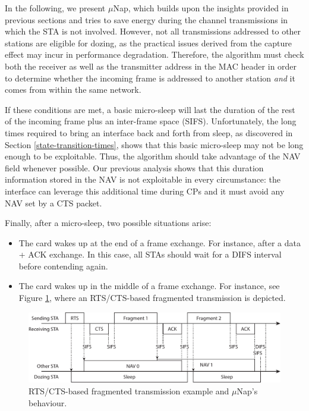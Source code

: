 \documentclass[twoside,nohyper]{tufte-book}
\providecommand{\tightlist}{%
  \setlength{\itemsep}{0pt}\setlength{\parskip}{0pt}}
\theoremstyle{definition}
\theoremstyle{definition}
\theoremstyle{definition}
\theoremstyle{remark}
\begin{document}
In the following, we present \(\mu\)Nap, which builds upon the insights
provided in previous sections and tries to save energy during the
channel transmissions in which the STA is not involved. However, not all
transmissions addressed to other stations are eligible for dozing, as
the practical issues derived from the capture effect may incur in
performance degradation. Therefore, the algorithm must check both the
receiver as well as the transmitter address in the MAC header in order
to determine whether the incoming frame is addressed to another station
\emph{and} it comes from within the same network.

If these conditions are met, a basic micro-sleep will last the duration
of the rest of the incoming frame plus an inter-frame space (SIFS).
Unfortunately, the long times required to bring an interface back and
forth from sleep, as discovered in Section \ref{state-transition-times},
shows that this basic micro-sleep may not be long enough to be
exploitable. Thus, the algorithm should take advantage of the NAV field
whenever possible. Our previous analysis shows that this duration
information stored in the NAV is not exploitable in every circumstance:
the interface can leverage this additional time during CPs and it must
avoid any NAV set by a CTS packet.

Finally, after a micro-sleep, two possible situations arise:

\begin{itemize}
\tightlist
\item
  The card wakes up at the end of a frame exchange. For instance, after
  a data + ACK exchange. In this case, all STAs should wait for a DIFS
  interval before contending again.
\item
  The card wakes up in the middle of a frame exchange. For instance, see
  Figure \ref{fig:fragments}, where an RTS/CTS-based fragmented
  transmission is depicted.
\end{itemize}




\begin{figure}

{\centering \includegraphics{img/05/fragments} 

}

\caption[RTS/CTS-based fragmented transmission example and
\(\mu\)Nap's behaviour.]{RTS/CTS-based fragmented transmission example and
\(\mu\)Nap's behaviour.}\label{fig:fragments}
\end{figure}
\end{document}
